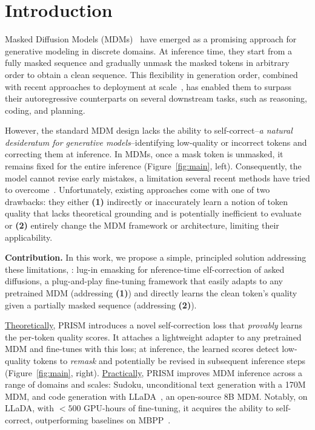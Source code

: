 \section{Introduction}
Masked Diffusion Models (MDMs)~\citep{sahoo2024simple,gat2024discrete,shi2024simplified}
have emerged as a promising approach for generative modeling in discrete domains. At inference time, they start from a fully masked sequence and gradually unmask the masked tokens in arbitrary order to obtain a clean sequence. This flexibility in generation order, combined with recent approaches to deployment at scale~\citep{nie2025large,dream2025,gemini2025diffusion,labs2025mercury,gong2025diffucoder}, has enabled them to surpass their autoregressive counterparts on several downstream tasks, such as reasoning, coding, and planning. 

However, the standard MDM design lacks the ability to self-correct--\emph{a natural desideratum for generative models}--identifying low-quality or incorrect tokens and correcting them at inference. In MDMs, once a mask token is unmasked, it remains fixed for the entire inference (Figure~\ref{fig:main}, left). Consequently, the model cannot revise early mistakes, a limitation several recent methods have tried to overcome~\citep{campbell2022continuous,lezama2022discrete,zhao2024informed,wang2025remasking,von2025generalized,peng2025pathplanningmaskeddiffusion}. Unfortunately, existing approaches come with one of two drawbacks: they either \textbf{(1)} indirectly or inaccurately learn a notion of token quality that lacks theoretical grounding and is potentially inefficient to evaluate or \textbf{(2)} entirely change the MDM framework or architecture, limiting their applicability.

\textbf{Contribution.} In this work, we propose a simple, principled solution addressing these limitations, : lug-in emasking for nference-time elf-correction of asked diffusions, a plug-and-play fine-tuning framework that easily adapts to any pretrained MDM (addressing {\textbf{(1)}}) and directly learns the clean token's quality given a partially masked sequence (addressing {\textbf{(2)}}).

\underline{Theoretically}, PRISM introduces a novel self-correction loss that \emph{provably} learns the per-token quality scores. It attaches a lightweight adapter to any pretrained MDM and fine-tunes with this loss; at inference, the learned scores detect low-quality tokens to \emph{remask} and potentially be revised in subsequent inference steps (Figure~\ref{fig:main}, right). \underline{Practically}, PRISM improves MDM inference across a range of domains and scales: Sudoku, unconditional text generation with a 170M MDM, and code generation with LLaDA~\citep{nie2025large}, an open-source 8B MDM. Notably, on LLaDA, with $<500$ GPU-hours of fine-tuning, it acquires the ability to self-correct, outperforming baselines on MBPP~\cite{austin2021program}.

